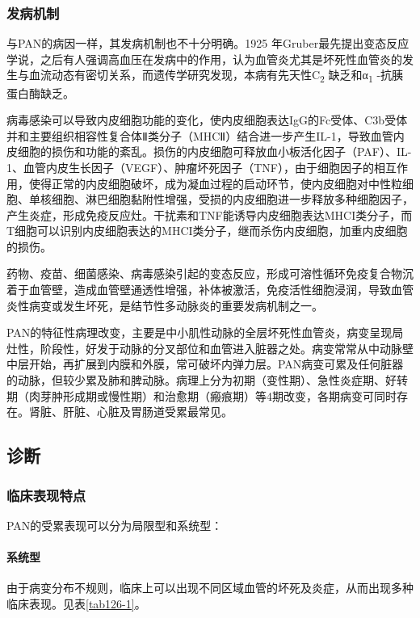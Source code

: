 \subsubsection{发病机制}

与PAN的病因一样，其发病机制也不十分明确。1925
年Gruber最先提出变态反应学说，之后有人强调高血压在发病中的作用，认为血管炎尤其是坏死性血管炎的发生与血流动态有密切关系，而遗传学研究发现，本病有先天性C\textsubscript{2}
缺乏和α\textsubscript{1} -抗胰蛋白酶缺乏。

病毒感染可以导致内皮细胞功能的变化，使内皮细胞表达IgG的Fc受体、C3b受体并和主要组织相容性复合体Ⅱ类分子（MHCⅡ）结合进一步产生IL-1，导致血管内皮细胞的损伤和功能的紊乱。损伤的内皮细胞可释放血小板活化因子（PAF）、IL-1、血管内皮生长因子（VEGF）、肿瘤坏死因子（TNF），由于细胞因子的相互作用，使得正常的内皮细胞破坏，成为凝血过程的启动环节，使内皮细胞对中性粒细胞、单核细胞、淋巴细胞黏附性增强，受损的内皮细胞进一步释放多种细胞因子，产生炎症，形成免疫反应灶。干扰素和TNF能诱导内皮细胞表达MHCI类分子，而T细胞可以识别内皮细胞表达的MHCI类分子，继而杀伤内皮细胞，加重内皮细胞的损伤。

药物、疫苗、细菌感染、病毒感染引起的变态反应，形成可溶性循环免疫复合物沉着于血管壁，造成血管壁通透性增强，补体被激活，免疫活性细胞浸润，导致血管炎性病变或发生坏死，是结节性多动脉炎的重要发病机制之一。

PAN的特征性病理改变，主要是中小肌性动脉的全层坏死性血管炎，病变呈现局灶性，阶段性，好发于动脉的分叉部位和血管进入脏器之处。病变常常从中动脉壁中层开始，再扩展到内膜和外膜，常可破坏内弹力层。PAN病变可累及任何脏器的动脉，但较少累及肺和脾动脉。病理上分为初期（变性期）、急性炎症期、好转期（肉芽肿形成期或慢性期）和治愈期（瘢痕期）等4期改变，各期病变可同时存在。肾脏、肝脏、心脏及胃肠道受累最常见。

\subsection{诊断}

\subsubsection{临床表现特点}

PAN的受累表现可以分为局限型和系统型：

\paragraph{系统型}

由于病变分布不规则，临床上可以出现不同区域血管的坏死及炎症，从而出现多种临床表现。见表\ref{tab126-1}。

